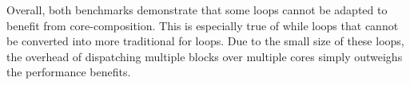 Overall, both benchmarks demonstrate that some loops cannot be adapted to benefit from core-composition.
This is especially true of while loops that cannot be converted into more traditional for loops.
Due to the small size of these loops, the overhead of dispatching multiple blocks over multiple cores simply outweighs the performance benefits.